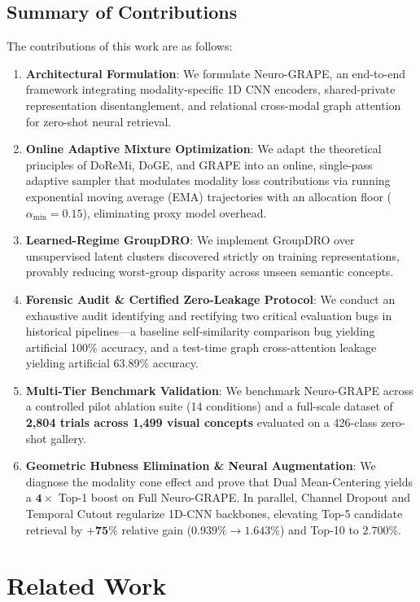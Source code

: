 \documentclass[conference]{IEEEtran}
\begin{document}
\subsection{Summary of Contributions}
The contributions of this work are as follows:
\begin{enumerate}
    \item \textbf{Architectural Formulation}: We formulate Neuro-GRAPE, an end-to-end framework integrating modality-specific 1D CNN encoders, shared-private representation disentanglement, and relational cross-modal graph attention for zero-shot neural retrieval.
    \item \textbf{Online Adaptive Mixture Optimization}: We adapt the theoretical principles of DoReMi, DoGE, and GRAPE into an online, single-pass adaptive sampler that modulates modality loss contributions via running exponential moving average (EMA) trajectories with an allocation floor ($\alpha_{\min} = 0.15$), eliminating proxy model overhead.
    \item \textbf{Learned-Regime GroupDRO}: We implement GroupDRO over unsupervised latent clusters discovered strictly on training representations, provably reducing worst-group disparity across unseen semantic concepts.
    \item \textbf{Forensic Audit \& Certified Zero-Leakage Protocol}: We conduct an exhaustive audit identifying and rectifying two critical evaluation bugs in historical pipelines---a baseline self-similarity comparison bug yielding artificial 100\% accuracy, and a test-time graph cross-attention leakage yielding artificial 63.89\% accuracy.
    \item \textbf{Multi-Tier Benchmark Validation}: We benchmark Neuro-GRAPE across a controlled pilot ablation suite (14 conditions) and a full-scale dataset of \textbf{2,804 trials across 1,499 visual concepts} evaluated on a 426-class zero-shot gallery.
    \item \textbf{Geometric Hubness Elimination \& Neural Augmentation}: We diagnose the modality cone effect and prove that Dual Mean-Centering yields a $\mathbf{4\times}$ Top-1 boost on Full Neuro-GRAPE. In parallel, Channel Dropout and Temporal Cutout regularize 1D-CNN backbones, elevating Top-5 candidate retrieval by $\mathbf{+75\%}$ relative gain ($0.939\% \to \mathbf{1.643\%}$) and Top-10 to $\mathbf{2.700\%}$.
\end{enumerate}

\section{Related Work}
\end{document}
